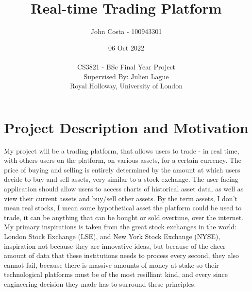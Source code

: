 \documentclass[titlepage]{article}
\title{Real-time Trading Platform}
\author{John Costa - 100943301}
\date{06 Oct 2022 \\
  \\
  \Large{CS3821 - BSc Final Year Project \\
Supervised By: Julien Lague \\
Royal Holloway, University of London}}
\begin{document}
\maketitle

\section{Project Description and Motivation}
My project will be a trading platform, that allows users to trade - in real time, with others users on the platform, on various assets, for a certain currency. The price of buying and selling is entirely determined by the amount at which users decide to buy and sell assets, very similar to a stock exchange. The user facing application should allow users to access charts of historical asset data, as well as view their current assets and buy/sell other assets. By the term assets, I don't mean real stocks, I mean some hypothetical asset the platform could be used to trade, it can be anything that can be bought or sold overtime, over the internet. \\

\noindent
My primary inspirations is taken from the great stock exchanges in the world: London Stock Exchange (LSE), and New York Stock Exchange (NYSE), inspiration not because they are innovative ideas, but because of the cheer amount of data that these institutions needs to process every second, they also cannot fail, because there is massive amounts of money at stake so their technological platforms must be of the most resilliant kind, and every since engineering decision they made has to surround these principles.
\end{document}
